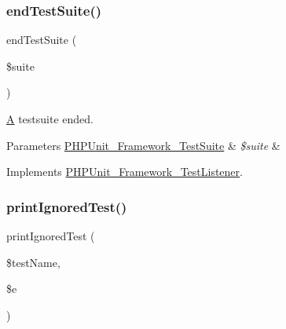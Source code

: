 \subsubsection{\texorpdfstring{end\+Test\+Suite()}{endTestSuite()}}
{\footnotesize\ttfamily end\+Test\+Suite (\begin{DoxyParamCaption}\item[{\mbox{\hyperlink{class_p_h_p_unit___framework___test_suite}{P\+H\+P\+Unit\+\_\+\+Framework\+\_\+\+Test\+Suite}}}]{\$suite }\end{DoxyParamCaption})}

\mbox{\hyperlink{class_a}{A}} testsuite ended.


\begin{DoxyParams}[1]{Parameters}
\mbox{\hyperlink{class_p_h_p_unit___framework___test_suite}{P\+H\+P\+Unit\+\_\+\+Framework\+\_\+\+Test\+Suite}} & {\em \$suite} & \\
\hline
\end{DoxyParams}


Implements \mbox{\hyperlink{interface_p_h_p_unit___framework___test_listener_aeec28a4d1328434916ebcdc1ca6b5527}{P\+H\+P\+Unit\+\_\+\+Framework\+\_\+\+Test\+Listener}}.

\mbox{\label{class_p_h_p_unit___util___log___team_city_a277dbcf7a698fc6fb61ed84278db3ecd}} 
\subsubsection{\texorpdfstring{print\+Ignored\+Test()}{printIgnoredTest()}}
{\footnotesize\ttfamily print\+Ignored\+Test (\begin{DoxyParamCaption}\item[{}]{\$test\+Name,  }\item[{Exception}]{\$e }\end{DoxyParamCaption})}

\mbox{\label{class_p_h_p_unit___util___log___team_city_ae4d4a8638af5b91aaa55d983037baf78}} 
